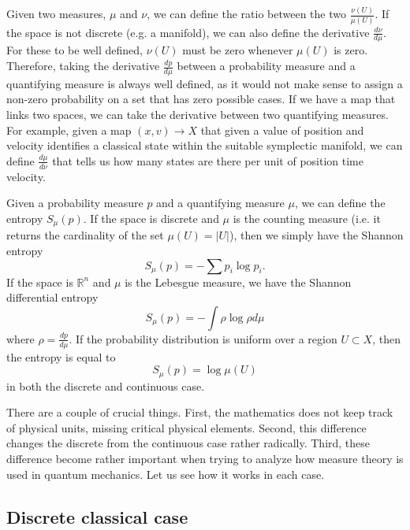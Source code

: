 \documentclass[10pt,twocolumn, nofootinbib]{revtex4-2}
\begin{document}
Given two measures, $\mu$ and $\nu$, we can define the ratio between the two $\frac{\nu(U)}{\mu(U)}$. If the space is not discrete (e.g. a manifold), we can also define the derivative $\frac{d\nu}{d\mu}$. For these to be well defined, $\nu(U)$ must be zero whenever $\mu(U)$ is zero. Therefore, taking the derivative $\frac{dp}{d\mu}$ between a probability measure and a quantifying measure is always well defined, as it would not make sense to assign a non-zero probability on a set that has zero possible cases. If we have a map that links two spaces, we can take the derivative between two quantifying measures. For example, given a map $(x, v) \to X$ that given a value of position and velocity identifies a classical state within the suitable symplectic manifold, we can define $\frac{d\mu}{d\nu}$ that tells us how many states are there per unit of position time velocity.

Given a probability measure $p$ and a quantifying measure $\mu$, we can define the entropy $S_{\mu}(p)$. If the space is discrete and $\mu$ is the counting measure (i.e. it returns the cardinality of the set $\mu(U) = |U|$), then we simply have the Shannon entropy
\begin{equation}\label{discrete_entropy}
	S_{\mu}(p) = - \sum p_i \log p_i.
\end{equation}
If the space is $\mathbb{R}^n$ and $\mu$ is the Lebesgue measure, we have the Shannon differential entropy
\begin{equation}
	S_{\mu}(p) = - \int \rho \log \rho d\mu
\end{equation}
where $\rho = \frac{dp}{d\mu}$. If the probability distribution is uniform over a region $U \subset X$, then the entropy is equal to
\begin{equation}
	S_{\mu}(p) = \log \mu(U)
\end{equation}
in both the discrete and continuous case.

There are a couple of crucial things. First, the mathematics does not keep track of physical units, missing critical physical elements. Second, this difference changes the discrete from the continuous case rather radically. Third, these difference become rather important when trying to analyze how measure theory is used in quantum mechanics. Let us see how it works in each case.

\subsection{Discrete classical case}
\end{document}
